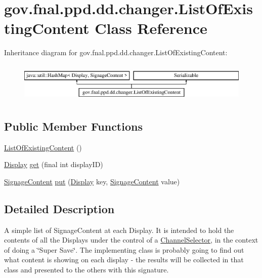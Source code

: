 \hypertarget{classgov_1_1fnal_1_1ppd_1_1dd_1_1changer_1_1ListOfExistingContent}{\section{gov.\-fnal.\-ppd.\-dd.\-changer.\-List\-Of\-Existing\-Content Class Reference}
\label{classgov_1_1fnal_1_1ppd_1_1dd_1_1changer_1_1ListOfExistingContent}
}
Inheritance diagram for gov.\-fnal.\-ppd.\-dd.\-changer.\-List\-Of\-Existing\-Content\-:\begin{figure}[H]
\begin{center}
\leavevmode
\includegraphics[height=1.931034cm]{classgov_1_1fnal_1_1ppd_1_1dd_1_1changer_1_1ListOfExistingContent}
\end{center}
\end{figure}
\subsection*{Public Member Functions}
\begin{DoxyCompactItemize}
\item 
\hyperlink{classgov_1_1fnal_1_1ppd_1_1dd_1_1changer_1_1ListOfExistingContent_a65e9c72fed68f71681551ba745df01bc}{List\-Of\-Existing\-Content} ()
\item 
\hyperlink{interfacegov_1_1fnal_1_1ppd_1_1dd_1_1signage_1_1Display}{Display} \hyperlink{classgov_1_1fnal_1_1ppd_1_1dd_1_1changer_1_1ListOfExistingContent_ac46b8d64363de8a10423c7d620d98593}{get} (final int display\-I\-D)
\item 
\hyperlink{interfacegov_1_1fnal_1_1ppd_1_1dd_1_1signage_1_1SignageContent}{Signage\-Content} \hyperlink{classgov_1_1fnal_1_1ppd_1_1dd_1_1changer_1_1ListOfExistingContent_a946a8fbe31fde4f9a1ead3a68e0912ae}{put} (\hyperlink{interfacegov_1_1fnal_1_1ppd_1_1dd_1_1signage_1_1Display}{Display} key, \hyperlink{interfacegov_1_1fnal_1_1ppd_1_1dd_1_1signage_1_1SignageContent}{Signage\-Content} value)
\end{DoxyCompactItemize}


\subsection{Detailed Description}
A simple list of Signage\-Content at each Display. It is intended to hold the contents of all the Displays under the control of a \hyperlink{classgov_1_1fnal_1_1ppd_1_1dd_1_1ChannelSelector}{Channel\-Selector}, in the context of doing a \char`\"{}\-Super Save\char`\"{}. The implementing class is probably going to find out what content is showing on each display -\/ the results will be collected in that class and presented to the others with this signature.


